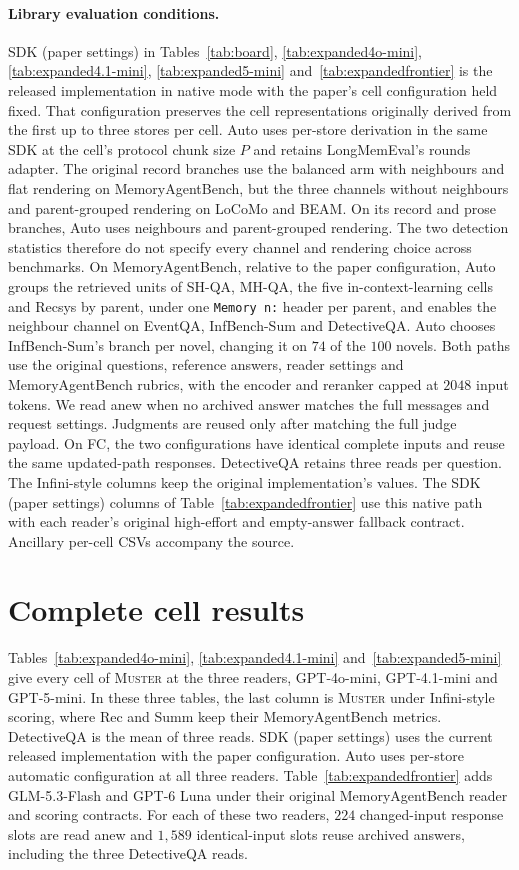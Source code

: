 \documentclass{article}
\newcommand{\sys}{\textsc{Muster}}
\begin{document}
\paragraph{Library evaluation conditions.} SDK (paper settings) in Tables~\ref{tab:board}, \ref{tab:expanded4o-mini}, \ref{tab:expanded4.1-mini}, \ref{tab:expanded5-mini} and~\ref{tab:expandedfrontier} is the released implementation in native mode with the paper's cell configuration held fixed. That configuration preserves the cell representations originally derived from the first up to three stores per cell. Auto uses per-store derivation in the same SDK at the cell's protocol chunk size $P$ and retains LongMemEval's rounds adapter. The original record branches use the balanced arm with neighbours and flat rendering on MemoryAgentBench, but the three channels without neighbours and parent-grouped rendering on LoCoMo and BEAM. On its record and prose branches, Auto uses neighbours and parent-grouped rendering. The two detection statistics therefore do not specify every channel and rendering choice across benchmarks. On MemoryAgentBench, relative to the paper configuration, Auto groups the retrieved units of SH-QA, MH-QA, the five in-context-learning cells and Recsys by parent, under one \texttt{Memory n:} header per parent, and enables the neighbour channel on EventQA, InfBench-Sum and DetectiveQA. Auto chooses InfBench-Sum's branch per novel, changing it on $74$ of the $100$ novels. Both paths use the original questions, reference answers, reader settings and MemoryAgentBench rubrics, with the encoder and reranker capped at $2048$ input tokens. We read anew when no archived answer matches the full messages and request settings. Judgments are reused only after matching the full judge payload. On FC, the two configurations have identical complete inputs and reuse the same updated-path responses. DetectiveQA retains three reads per question. The Infini-style columns keep the original implementation's values. The SDK (paper settings) columns of Table~\ref{tab:expandedfrontier} use this native path with each reader's original high-effort and empty-answer fallback contract. Ancillary per-cell CSVs accompany the source.

\section{Complete cell results}\label{app:expanded}

Tables~\ref{tab:expanded4o-mini}, \ref{tab:expanded4.1-mini} and~\ref{tab:expanded5-mini} give every cell of \sys{} at the three readers, GPT-4o-mini, GPT-4.1-mini and GPT-5-mini. In these three tables, the last column is \sys{} under Infini-style scoring, where Rec and Summ keep their MemoryAgentBench metrics. DetectiveQA is the mean of three reads. SDK (paper settings) uses the current released implementation with the paper configuration. Auto uses per-store automatic configuration at all three readers. Table~\ref{tab:expandedfrontier} adds GLM-5.3-Flash and GPT-6 Luna under their original MemoryAgentBench reader and scoring contracts. For each of these two readers, $224$ changed-input response slots are read anew and $1{,}589$ identical-input slots reuse archived answers, including the three DetectiveQA reads.
\end{document}
